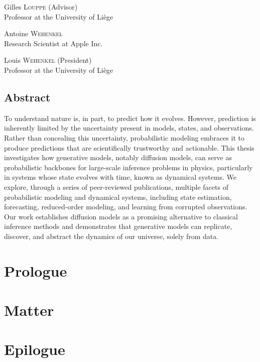 \documentclass[a4paper, 10pt, oneside, openright]{book}
\begin{document}
{\large Gilles \textsc{Louppe} (Advisor)} \\
Professor at the University of Liège

{\large Antoine \textsc{Wehenkel}} \\
Research Scientist at Apple Inc.

{\large Louis \textsc{Wehenkel} (President)} \\
Professor at the University of Liège

\chapter*{Abstract}

To understand nature is, in part, to predict how it evolves. However, prediction is inherently limited by the uncertainty present in models, states, and observations. Rather than concealing this uncertainty, probabilistic modeling embraces it to produce predictions that are scientifically trustworthy and actionable. This thesis investigates how generative models, notably diffusion models, can serve as probabilistic backbones for large-scale inference problems in physics, particularly in systems whose state evolves with time, known as dynamical systems. We explore, through a series of peer-reviewed publications, multiple facets of probabilistic modeling and dynamical systems, including state estimation, forecasting, reduced-order modeling, and learning from corrupted observations. Our work establishes diffusion models as a promising alternative to classical inference methods and demonstrates that generative models can replicate, discover, and abstract the dynamics of our universe, solely from data.



\tableofcontents

\mainmatter

\cleardoublepage
\part{Prologue} \label{part:prologue}
\restoregeometry



\cleardoublepage
\part{Matter} \label{part:matter}
\restoregeometry







\cleardoublepage
\part{Epilogue} \label{part:epilogue}
\restoregeometry



\backmatter

% 
\end{document}
